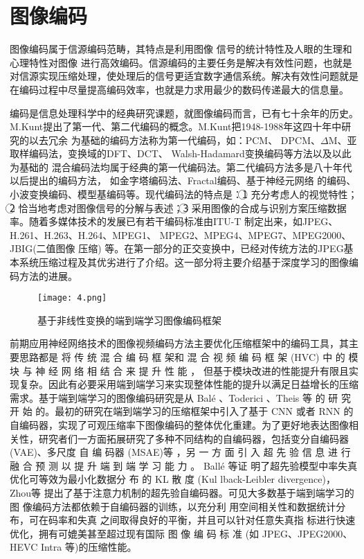 \section{图像编码}
\label{sec:image_encode}

图像编码属于信源编码范畴，其特点是利用图像 信号的统计特性及人眼的生理和心理特性对图像 进行高效编码。信源编码的主要任务是解决有效性问题，也就是对信源实现压缩处理，使处理后的信号更适宜数字通信系统。解决有效性问题就是在编码过程中尽量提高编码效率，也就是力求用最少的数码传递最大的信息量。

编码是信息处理科学中的经典研究课题，就图像编码而言，已有七十余年的历史。M.Kunt提出了第一代、第二代编码的概念。M.Kunt把1948-1988年这四十年中研究的以去冗余 为基础的编码方法称为第一代编码，如：PCM、 DPCM、$\Delta$M、亚取样编码法，变换域的DFT、DCT、 Walsh-Hadamard变换编码等方法以及以此为基础的 混合编码法均属于经典的第一代编码法。第二代编码方法多是八十年代以后提出的编码方法， 如金字塔编码法、Fractal编码、基于神经元网络 的编码、小波变换编码、模型基编码等。现代编码法的特点是：\textcircled{1} 充分考虑人的视觉特性；\textcircled{2} 恰当地考虑对图像信号的分解与表述；\textcircled{3} 采用图像的合成与识别方案压缩数据率。随着多媒体技术的发展已有若干编码标准由ITU-T 制定出来，如JPEG、H.261、H.263、H.264、MPEG1、 MPEG2、MPEG4、MPEG7、MPEG2000、JBIG(二值图像 压缩) 等。在第一部分的正交变换中，已经对传统方法的JPEG基本系统压缩过程及其优劣进行了介绍。这一部分将主要介绍基于深度学习的图像编码方法的进展。

\begin{figure*}[!ht]
	\centering
	\texttt{[image: 4.png]}
	\caption{基于非线性变换的端到端学习图像编码框架}
	\label{fig:fig4}
\end{figure*}

前期应用神经网络技术的图像视频编码方法主要优化压缩框架中的编码工具，其主要思路都是 将 传 统 混 合 编 码 框 架和 混 合 视 频 编 码 框 架 (HVC) 中 的 模 块 与 神 经 网 络 相 结 合 来 提 升 性 能 ， 但基于模块改进的性能提升有限且实现复杂。因此有必要采用端到端学习来实现整体性能的提升以满足日益增长的压缩需求。基于端到端学习的图像编码研究是从 Balé \cite{balle2016end, DBLP:conf/pcs/BalleLS16, balle2018variational}、Toderici \cite{toderici2015variable, toderici2017full}、Theis \cite{theis2017lossy} 等 的 研 究 开 始 的。最初的研究在端到端学习的压缩框架中引入了基于 CNN 或者 RNN 的自编码器，实现了可观压缩率下图像编码的整体优化重建。为了更好地表达图像相关性，研究者们一方面拓展研究了多种不同结构的自编码器，包括变分自编码器(VAE)、多尺度 自 编 码器 (MSAE)等 ，另 一 方 面 引 入 超 先 验 信 息 进 行 融 合 预 测 以 提 升 端 到 端 学 习 能 力 。 Ballé 等证 明了超先验模型中率失真优化可等效为最小化数据分 布 的 KL 散 度 (Kul lback-Leibler divergence)， Zhou等 \cite{zhou2019end}提出了基于注意力机制的超先验自编码器。可见大多数基于端到端学习的图 像编码方法都依赖于自编码器的训练，以充分利 用空间相关性和数据统计分布，可在码率和失真 之间取得良好的平衡，并且可以针对任意失真指 标进行快速优化，拥有可媲美甚至超过现有国际 图 像 编 码 标 准 (如 JPEG、JPEG2000、HEVC Intra 等)的压缩性能。

